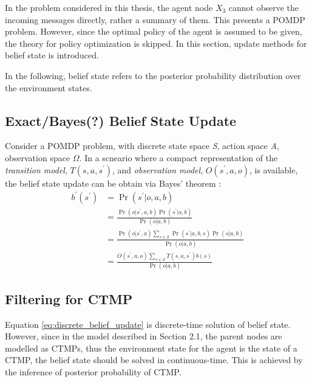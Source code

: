In the problem considered in this thesis, the agent node $ X_{3} $ cannot observe the incoming messages directly, rather a summary of them. This presents a POMDP problem. However, since the optimal policy of the agent is assumed to be given, the theory for policy optimization is skipped. In this section, update methods for belief state is introduced.

In the following, belief state refers to the posterior probability distribution over the environment states.

\subsection{Exact/Bayes(?) Belief State Update}
\label{sec:exact_update}
Consider a POMDP problem, with discrete state space \textit{S}, action space \textit{A}, observation space $ \Omega $. In a scneario where a compact representation of the \textit{transition model}, $ T(s, a, s^{\prime})$,  and \textit{observation model}, $ O(s^{\prime}, a, o) $, is available, the belief state update can be obtain via Bayes' theorem \cite{KAELBLING199899}:
\begin{align}
b^{\prime}\left(s^{\prime}\right) &=\operatorname{Pr}\left(s^{\prime} | o, a, b\right) \nonumber\\
&=\frac{\operatorname{Pr}\left(o | s^{\prime}, a, b\right) \operatorname{Pr}\left(s^{\prime} | a, b\right)}{\operatorname{Pr}(o | a, b)} \nonumber\\
&=\frac{\operatorname{Pr}\left(o | s^{\prime}, a\right) \sum_{s \in \mathcal{S}} \operatorname{Pr}\left(s^{\prime} | a, b, s\right) \operatorname{Pr}(s | a, b)}{\operatorname{Pr}(o | a, b)} \nonumber\\
&=\frac{O\left(s^{\prime}, a, o\right) \sum_{s \in \mathcal{S}} T\left(s,a, s^{\prime}\right) b(s)}{\operatorname{Pr}(o | a, b)}
\label{eq:discrete_belief_update}
\end{align}

\subsection{Filtering for CTMP}
\label{sec:filtering_CTMC}
Equation \ref{eq:discrete_belief_update} is discrete-time solution of belief state. However, since in the model described in Section 2.1, the parent nodes are modelled as CTMPs, thus the environment state for the agent is the state of a CTMP, the belief state should be solved in continuous-time. This is achieved by the inference of posterior probability of CTMP. \cite{article}

